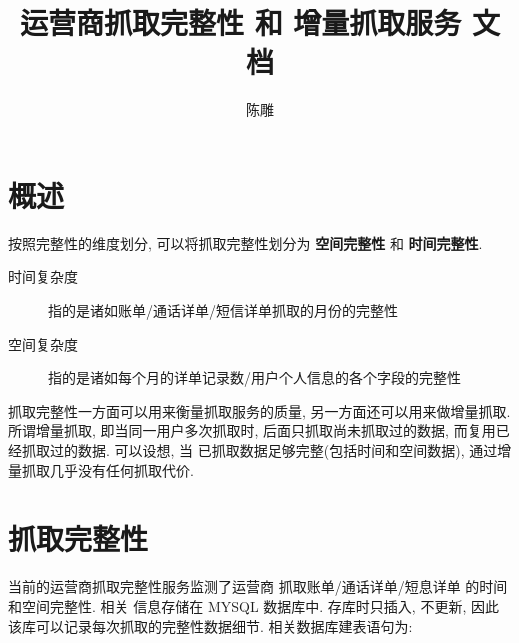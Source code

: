 \documentclass[UTF8]{ctexart}
\title{运营商抓取完整性 和 增量抓取服务 文档}
\author{陈雕}
\begin{document}
\maketitle
\newpage

\tableofcontents
\newpage


\section{概述}
按照完整性的维度划分, 可以将抓取完整性划分为 \textbf{空间完整性} 和 \textbf{时间完整性}.

\begin{description}
	\item[时间复杂度] 指的是诸如账单/通话详单/短信详单抓取的月份的完整性
	\item[空间复杂度] 指的是诸如每个月的详单记录数/用户个人信息的各个字段的完整性
\end{description}

抓取完整性一方面可以用来衡量抓取服务的质量, 另一方面还可以用来做增量抓取.  所谓增量抓取, 
即当同一用户多次抓取时, 后面只抓取尚未抓取过的数据, 而复用已经抓取过的数据. 可以设想, 当
已抓取数据足够完整(包括时间和空间数据), 通过增量抓取几乎没有任何抓取代价.

\section{抓取完整性}
当前的运营商抓取完整性服务监测了运营商 抓取账单/通话详单/短息详单 的时间和空间完整性. 相关
信息存储在 MYSQL 数据库中. 存库时只插入, 不更新, 因此该库可以记录每次抓取的完整性数据细节.
相关数据库建表语句为:
\end{document}
